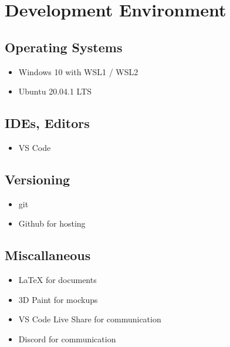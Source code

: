 \section{Development Environment}
\subsection{Operating Systems}
\begin{itemize}
    \item Windows 10 with WSL1 / WSL2
    \item Ubuntu 20.04.1 LTS
\end{itemize}
\subsection{IDEs, Editors}
\begin{itemize}
    \item VS Code
\end{itemize}
\subsection{Versioning}
\begin{itemize}
    \item git
    \item Github for hosting
\end{itemize}
\subsection{Miscallaneous}
\begin{itemize}
    \item {\LaTeX} for documents
    \item 3D Paint for mockups %
    \item VS Code Live Share for communication
    \item Discord for communication
\end{itemize}